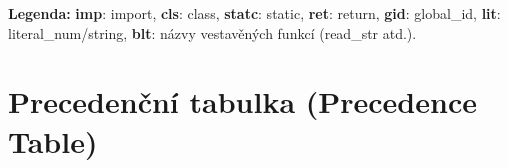 \begin{table}
    \vspace{0.5cm}
    \textbf{Legenda:} \textbf{imp}: import, \textbf{cls}: class, \textbf{statc}: static, \textbf{ret}: return, \textbf{gid}: global\_id, \textbf{lit}: literal\_num/string, \textbf{blt}: názvy vestavěných funkcí (read\_str atd.).
\end{table}





\begin{table}
    \centering
\section{Precedenční tabulka (Precedence Table)}
    \centering
    \setlength{\tabcolsep}{3pt} %
    \renewcommand{\arraystretch}{1.4} %


\end{table}
